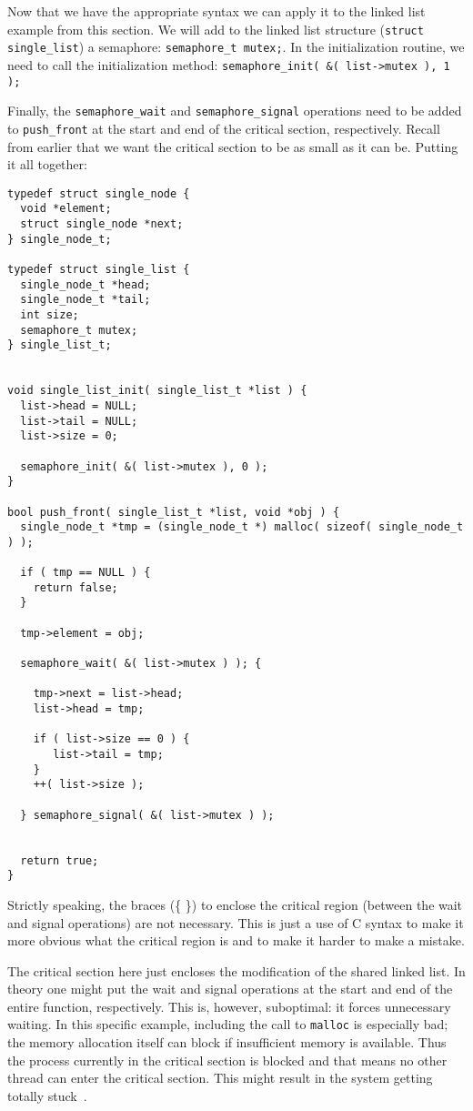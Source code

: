 Now that we have the appropriate syntax we can apply it to the linked list example from this section. We will add to the linked list structure (\texttt{struct single\_list}) a semaphore: \texttt{semaphore\_t mutex;}. In the initialization routine, we need to call the initialization method: \texttt{semaphore\_init( \&( list->mutex ), 1 );}

Finally, the \texttt{semaphore\_wait} and \texttt{semaphore\_signal} operations need to be added to \texttt{push\_front} at the start and end of the critical section, respectively. Recall from earlier that we want the critical section to be as small as it can be. Putting it all together:

\begin{verbatim}
typedef struct single_node {
  void *element;
  struct single_node *next;
} single_node_t;

typedef struct single_list {
  single_node_t *head;
  single_node_t *tail;
  int size;
  semaphore_t mutex;
} single_list_t;


void single_list_init( single_list_t *list ) {
  list->head = NULL;
  list->tail = NULL;
  list->size = 0;

  semaphore_init( &( list->mutex ), 0 );
}

bool push_front( single_list_t *list, void *obj ) {
  single_node_t *tmp = (single_node_t *) malloc( sizeof( single_node_t ) );
  
  if ( tmp == NULL ) {
    return false;
  }
  
  tmp->element = obj;
  
  semaphore_wait( &( list->mutex ) ); {
  
    tmp->next = list->head;
    list->head = tmp;

    if ( list->size == 0 ) {
       list->tail = tmp;
    }
    ++( list->size );
  
  } semaphore_signal( &( list->mutex ) );
  
  
  return true;
}
\end{verbatim}

Strictly speaking, the braces (\{ \}) to enclose the critical region (between the wait and signal operations) are not necessary. This is just a use of C syntax to make it more obvious what the critical region is and to make it harder to make a mistake.

The critical section here just encloses the modification of the shared linked list. In theory one might put the wait and signal operations at the start and end of the entire function, respectively. This is, however, suboptimal: it forces unnecessary waiting. In this specific example, including the call to \texttt{malloc} is especially bad; the memory allocation itself can block if insufficient memory is available. Thus the process currently in the critical section is blocked and that means no other thread can enter the critical section. This might result in the system getting totally stuck~\cite{mte241}.

